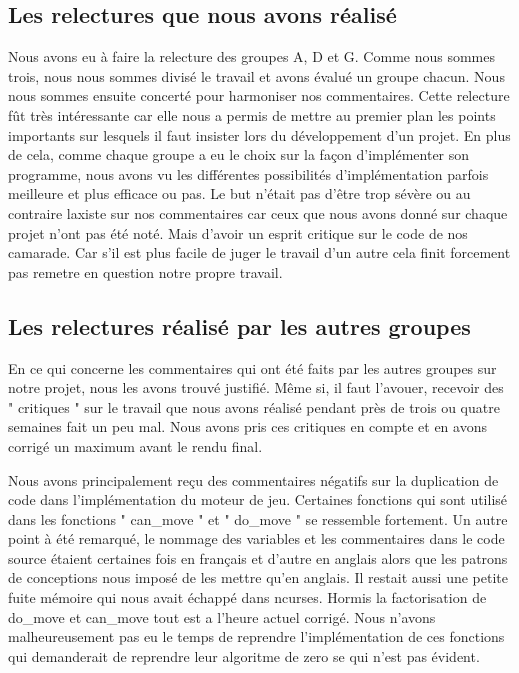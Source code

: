 \documentclass[12pt]{article}
\begin{document}
\subsection{Les relectures que nous avons réalisé}
Nous avons eu à faire la relecture des groupes A, D et G. Comme nous sommes
trois, nous nous sommes divisé le travail et avons évalué un groupe
chacun. Nous nous sommes ensuite concerté pour harmoniser nos commentaires.
Cette relecture fût très intéressante car elle nous a permis de mettre au
premier plan les points importants sur lesquels il faut insister lors du
développement d'un projet. En plus de cela, comme chaque groupe a eu le choix
sur la façon d'implémenter son programme, nous avons vu les différentes
possibilités d'implémentation parfois meilleure et plus efficace ou pas. Le
but n'était pas d'être trop sévère ou au contraire laxiste sur nos
commentaires car ceux que nous avons donné sur chaque projet n'ont pas été
noté. Mais d'avoir un esprit critique sur le code de nos camarade. Car s'il est plus facile
de juger le travail d'un autre cela finit forcement pas remetre en question notre
propre travail.
\subsection{Les relectures réalisé par les autres groupes}
\label{notre_etude}
En ce qui concerne les commentaires qui ont été faits par les autres groupes
sur notre projet, nous les avons trouvé justifié. Même si, il faut
l'avouer, recevoir des " critiques " sur le travail que nous avons
réalisé pendant près de trois ou quatre semaines fait un peu mal. Nous avons pris ces critiques en compte et en avons corrigé un maximum avant le rendu final. 
\par Nous avons principalement reçu des commentaires négatifs sur la
duplication de code dans l'implémentation du moteur de jeu. Certaines fonctions
qui sont utilisé dans les fonctions " can\_move " et " do\_move " se
ressemble fortement. Un autre point à été remarqué, le nommage des
variables et les commentaires dans le code source étaient certaines fois en
français et d'autre en anglais alors que les patrons de conceptions nous
imposé de les mettre qu'en anglais. Il restait aussi une petite fuite mémoire
qui nous avait échappé dans ncurses. Hormis la factorisation de do\_move et can\_move tout
est a l'heure actuel corrigé. Nous n'avons malheureusement pas eu le temps de
reprendre l'implémentation de ces fonctions qui demanderait de reprendre
leur algoritme de zero se qui n'est pas évident.
\end{document}
